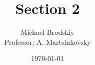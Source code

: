 


\title{Section 2}
\date{\today}
\author{Michael Brodskiy\\ \small Professor: A. Martsinkovsky}



\maketitle

\newpage

\tableofcontents

\newpage

